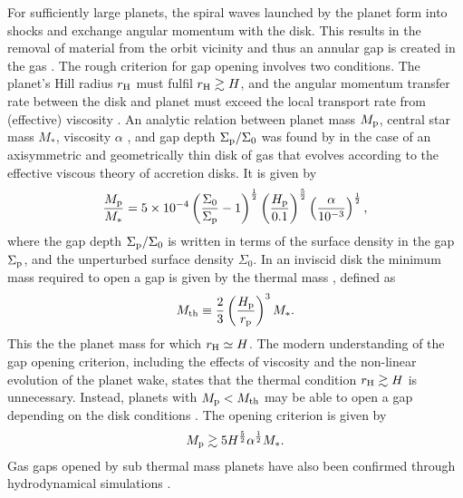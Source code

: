 For sufficiently large planets, the spiral waves launched by the planet form into shocks and exchange angular momentum with the disk. 
This results in the removal of material from the orbit vicinity and thus an annular gap is created in the gas \citep{lin1979,goldreich1979,goldreich1980}. 
The rough criterion for gap opening involves two conditions. 
The planet's Hill radius $r_{\rm H}$ \citep{hill1878} must fulfil $r_{\rm H} \gtrsim H$, and the angular momentum transfer rate between the disk and planet must exceed the local transport rate from (effective) viscosity \citep{lin1993}.
An analytic relation between planet mass $M_{\rm p}$, central star mass $M_*$, viscosity $\alpha$ \citep{shakura1973}, and gap depth $\Sigma_{\rm p} / \Sigma_0$ was found by \citet{kanagawa2015} in the case of an axisymmetric and geometrically thin disk of gas that evolves according to the effective viscous theory of accretion disks. It is given by
\begin{align}
    \frac{M_{\rm p}}{M_*} = 5 \times 10^{-4} \left( \frac{\Sigma_0}{\Sigma_{\rm p}} - 1 \right)^{\frac{1}{2}} \left( \frac{H_{\rm p}}{0.1}  \right)^{\frac{5}{2}} \left( \frac{\alpha}{10^{-3}} \right)^{\frac{1}{2}},
\end{align}
where the gap depth $\Sigma_{\rm p} / \Sigma_0$ is written in terms of the surface density in the gap $\Sigma_{\rm p}$, and the unperturbed surface density $\Sigma_0$. 
In an inviscid disk the minimum mass required to open a gap is given by the thermal mass \citep{lin1993}, defined as \citep{goodman2001}
\begin{align}
    M_{\rm th} \equiv \frac{2}{3} \left( \frac{H_{\rm p}}{r_{\rm p}}  \right)^3 M_*. \label{eq:thermalmass}
\end{align}
This the the planet mass for which $r_{\rm H} \simeq H$. 
The modern understanding of the gap opening criterion, including the effects of viscosity and the non-linear evolution of the planet wake, states that the thermal condition $r_{\rm H} \gtrsim H$ is unnecessary. 
Instead, planets with $M_{\rm p} < M_{\rm th}$ may be able to open a gap depending on the disk conditions \citep{rafikov2002}. 
The opening criterion is given by \citep{kanagawa2015a}
\begin{align}
    M_{\rm p} \gtrsim 5 H^\frac{5}{2} \alpha^\frac{1}{2} M_*.
\end{align}
Gas gaps opened by sub thermal mass planets have also been confirmed through hydrodynamical simulations \citep{duffell2013}.

